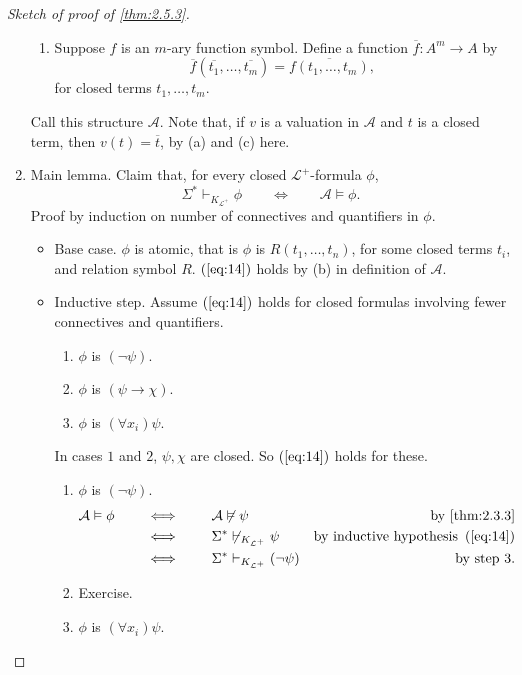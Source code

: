 \documentclass{article}
\newcommand{\A}{\mathcal{A}}
\renewcommand{\L}{\mathcal{L}}
\newcommand{\rb}[1]{\left( #1 \right)}
\newcommand{\notb}[1]{\rb{\neg #1}}
\newcommand{\impb}[2]{\rb{#1 \rightarrow #2}}
\newcommand{\fab}[1]{\rb{\forall #1}}
\theoremstyle{definition}\newtheorem{definition}{Definition}[subsection]
\theoremstyle{definition}\newtheorem{remark1}[definition]{Remark}
\theoremstyle{definition}\newtheorem{example1}[definition]{Example}
\theoremstyle{definition}\newtheorem*{remark2}{Remark}
\theoremstyle{definition}\newtheorem*{example2}{Example}
\theoremstyle{definition}\newtheorem*{note}{Note}
\theoremstyle{definition}\newtheorem*{notation}{Notation}
\begin{document}
\begin{proof}[Sketch of proof of \ref{thm:2.5.3}]
\begin{enumerate}[leftmargin=0.5in, label=Step \arabic*.]
\begin{enumerate}
\item Suppose $ f $ is an $ m $-ary function symbol. Define a function $ \overline{f} : A^m \to A $ by
$$ \overline{f}\rb{\overline{t_1}, \dots, \overline{t_m}} = \overline{f\rb{t_1, \dots, t_m}}, $$
for closed terms $ t_1, \dots, t_m $.
\end{enumerate}
Call this structure $ \A $. Note that, if $ v $ is a valuation in $ \A $ and $ t $ is a closed term, then $ v\rb{t} = \overline{t} $, by (a) and (c) here.
\pagebreak
\item Main lemma. Claim that, for every closed $ \L^+ $-formula $ \phi $,
\begin{equation}
\label{eq:14}
\Sigma^* \vdash_{K_{\L^+}} \phi \qquad \iff \qquad \A \vDash \phi.
\end{equation}
Proof by induction on number of connectives and quantifiers in $ \phi $.
\begin{itemize}
\item Base case. $ \phi $ is atomic, that is $ \phi $ is $ R\rb{t_1, \dots, t_n} $, for some closed terms $ t_i $, and relation symbol $ R $. $ \rb{\ref{eq:14}} $ holds by (b) in definition of $ \A $.
\item Inductive step. Assume $ \rb{\ref{eq:14}} $ holds for closed formulas involving fewer connectives and quantifiers.
\begin{enumerate}[leftmargin=0.5in, label=Case \arabic*.]
\item $ \phi $ is $ \notb{\psi} $.
\item $ \phi $ is $ \impb{\psi}{\chi} $.
\item $ \phi $ is $ \fab{x_i}\psi $.
\end{enumerate}
In cases $ 1 $ and $ 2 $, $ \psi, \chi $ are closed. So $ \rb{\ref{eq:14}} $ holds for these.
\begin{enumerate}[leftmargin=0.5in, label=Case \arabic*.]
\item $ \phi $ is $ \notb{\psi} $.
\begin{align*}
\A \vDash \phi \qquad
& \iff \qquad \A \not\vDash \psi & \text{by \ref{thm:2.3.3}} \\
& \iff \qquad \Sigma^* \not\vdash_{K_{\L^+}} \psi & \text{by inductive hypothesis} \ \rb{\ref{eq:14}} \\
& \iff \qquad \Sigma^* \vdash_{K_{\L^+}} \notb{\psi} & \text{by step} \ 3.
\end{align*}
\item Exercise.
\item $ \phi $ is $ \fab{x_i}\psi $.
\begin{enumerate}[leftmargin=0.5in, label=Case 3\alph*.]

\end{enumerate}
\end{enumerate}
\end{itemize}
\end{enumerate}
\end{proof}
\end{document}
